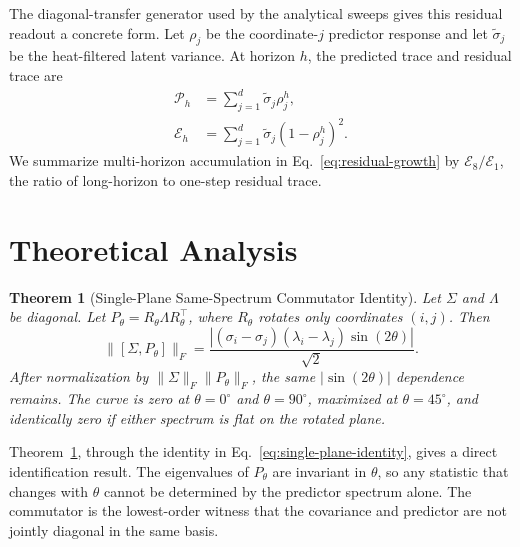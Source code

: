 \documentclass{article}
\newtheorem{theorem}{Theorem}
\newcommand{\comm}[2]{[#1,#2]}
\begin{document}
The diagonal-transfer generator used by the analytical sweeps gives this residual readout a concrete form. Let $\rho_j$ be the coordinate-$j$ predictor response and let $\tilde\sigma_j$ be the heat-filtered latent variance. At horizon $h$, the predicted trace and residual trace are
\begin{subequations}
\label{eq:trace-readouts}
\begin{align}
\mathcal{P}_h&=\sum_{j=1}^d \tilde\sigma_j\rho_j^h,
\label{eq:predicted-trace}\\
\mathcal{E}_h&=\sum_{j=1}^d \tilde\sigma_j(1-\rho_j^h)^2 .
\label{eq:residual-growth}
\end{align}
\end{subequations}
We summarize multi-horizon accumulation in Eq.~\eqref{eq:residual-growth} by $\mathcal{E}_8/\mathcal{E}_1$, the ratio of long-horizon to one-step residual trace.

\section{Theoretical Analysis}

\begin{theorem}[Single-Plane Same-Spectrum Commutator Identity]
\label{thm:single-plane}
Let $\Sigma$ and $\Lambda$ be diagonal. Let $P_\theta=R_\theta\Lambda R_\theta^\top$, where $R_\theta$ rotates only coordinates $(i,j)$. Then
\begin{equation}
\|\comm{\Sigma}{P_\theta}\|_F
=
\frac{|(\sigma_i-\sigma_j)(\lambda_i-\lambda_j)\sin(2\theta)|}{\sqrt{2}} .
\label{eq:single-plane-identity}
\end{equation}
After normalization by $\|\Sigma\|_F\|P_\theta\|_F$, the same $|\sin(2\theta)|$ dependence remains. The curve is zero at $\theta=0^\circ$ and $\theta=90^\circ$, maximized at $\theta=45^\circ$, and identically zero if either spectrum is flat on the rotated plane.
\end{theorem}

Theorem~\ref{thm:single-plane}, through the identity in Eq.~\eqref{eq:single-plane-identity}, gives a direct identification result. The eigenvalues of $P_\theta$ are invariant in $\theta$, so any statistic that changes with $\theta$ cannot be determined by the predictor spectrum alone. The commutator is the lowest-order witness that the covariance and predictor are not jointly diagonal in the same basis.
\end{document}
